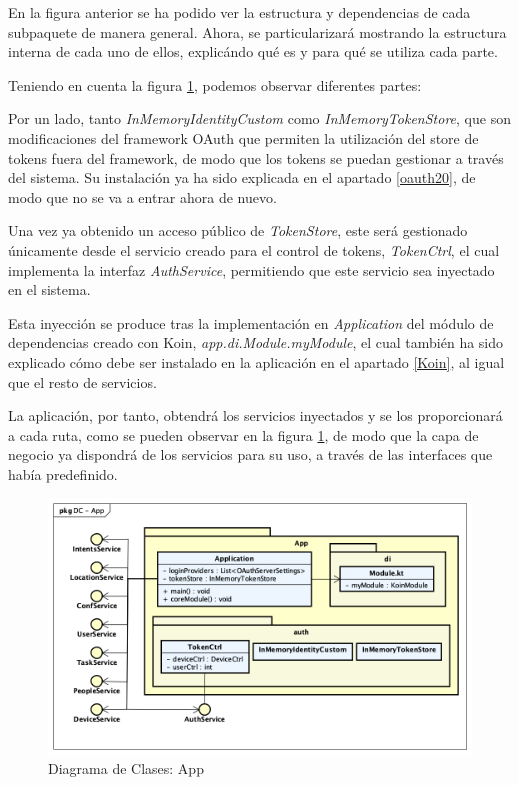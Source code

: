     En la figura anterior se ha podido ver la estructura y dependencias de cada subpaquete de manera general.
    Ahora, se particularizará mostrando la estructura interna de cada uno de ellos, explicándo qué es y para qué se utiliza cada parte.
    
    Teniendo en cuenta la figura \ref{fig:dc.app}, podemos observar diferentes partes:
    
    Por un lado, tanto \textit{InMemoryIdentityCustom} como  \textit{InMemoryTokenStore}, que son modificaciones del framework OAuth que permiten la utilización del store de tokens fuera del framework, de modo que los tokens se puedan gestionar a través del sistema. Su instalación ya ha sido explicada en el apartado \ref{oauth20}, de modo que no se va a entrar ahora de nuevo.
    
    Una vez ya obtenido un acceso público de \textit{TokenStore}, este será gestionado únicamente desde el servicio creado para el control de tokens, \textit{TokenCtrl}, el cual implementa la interfaz \textit{AuthService}, permitiendo que este servicio sea inyectado en el sistema.
    
    Esta inyección se produce tras la implementación en \textit{Application} del módulo de dependencias creado con Koin, \textit{app.di.Module.myModule}, el cual también ha sido explicado cómo debe ser instalado en la aplicación en el apartado \ref{Koin}, al igual que el resto de servicios.
    
    La aplicación, por tanto, obtendrá los servicios inyectados y se los proporcionará a cada ruta, como se pueden observar en la figura \ref{fig:dc.app}, de modo que la capa de negocio ya dispondrá de los servicios para su uso, a través de las interfaces que había predefinido.

    \begin{figure}[H]
        \centering
        \includegraphics[width=14cm]{./img/arch/back/dc.app.png}
        \caption{Diagrama de Clases: App}
        \label{fig:dc.app}
    \end{figure}

